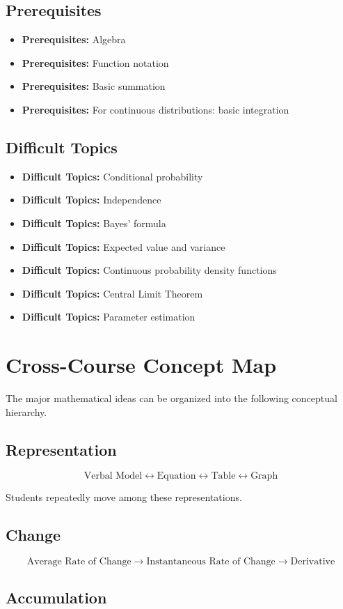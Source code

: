 \documentclass[11pt]{article}
\newcommand{\difficult}[1]{\item \textbf{Difficult Topics:} #1}
\newcommand{\prereq}[1]{\item \textbf{Prerequisites:} #1}
\begin{document}
\subsection{Prerequisites}

\begin{itemize}
    \prereq{Algebra}
    \prereq{Function notation}
    \prereq{Basic summation}
    \prereq{For continuous distributions: basic integration}
\end{itemize}

\subsection{Difficult Topics}

\begin{itemize}
    \difficult{Conditional probability}
    \difficult{Independence}
    \difficult{Bayes' formula}
    \difficult{Expected value and variance}
    \difficult{Continuous probability density functions}
    \difficult{Central Limit Theorem}
    \difficult{Parameter estimation}
\end{itemize}


\section{Cross-Course Concept Map}

The major mathematical ideas can be organized into the following
conceptual hierarchy.

\subsection{Representation}

\[
\text{Verbal Model}
\leftrightarrow
\text{Equation}
\leftrightarrow
\text{Table}
\leftrightarrow
\text{Graph}
\]

Students repeatedly move among these representations.

\subsection{Change}

\[
\text{Average Rate of Change}
\rightarrow
\text{Instantaneous Rate of Change}
\rightarrow
\text{Derivative}
\]

\subsection{Accumulation}
\end{document}
